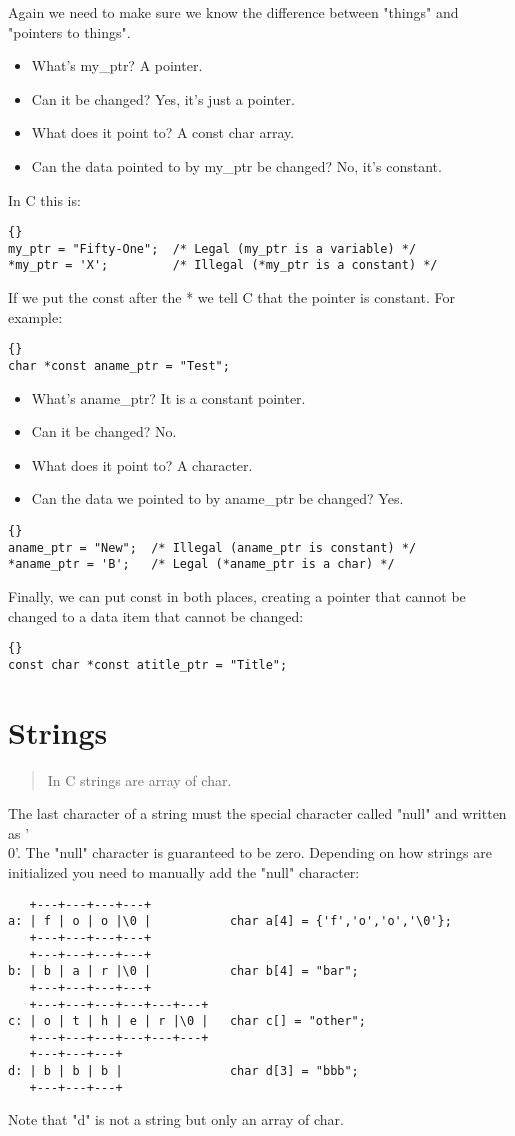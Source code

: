 \documentclass{report}
\begin{document}
Again we need to make sure we know the difference between "things" and "pointers to things".
\begin{itemize}
\item What's my\_ptr? A pointer.
\item Can it be changed? Yes, it's just a pointer.
\item What does it point to? A const char array.
\item Can the data pointed to by my\_ptr be changed? No, it's constant.
\end{itemize}
In C this is:
\begin{lstlisting}{}
my_ptr = "Fifty-One";  /* Legal (my_ptr is a variable) */
*my_ptr = 'X';         /* Illegal (*my_ptr is a constant) */
\end{lstlisting}
If we put the const after the * we tell C that the pointer is constant. 
For example:
\begin{lstlisting}{}
char *const aname_ptr = "Test";
\end{lstlisting}
\begin{itemize}
\item What's aname\_ptr? It is a constant pointer.
\item Can it be changed? No.
\item What does it point to? A character.
\item Can the data we pointed to by aname\_ptr be changed? Yes.
\end{itemize}
\begin{lstlisting}{}
aname_ptr = "New";  /* Illegal (aname_ptr is constant) */
*aname_ptr = 'B';   /* Legal (*aname_ptr is a char) */
\end{lstlisting}
Finally, we can put const in both places, creating a pointer that cannot be changed to a data item that cannot be changed:
\begin{lstlisting}{}
const char *const atitle_ptr = "Title";
\end{lstlisting}

\section{Strings}
\begin{quote}
In C strings are array of char.
\end{quote}
The last character of a string must the special character called "null" and written as '\\0'.
The "null" character is guaranteed to be zero. Depending on how strings are initialized you need to manually add the "null" character:
\begin{verbatim}
   +---+---+---+---+
a: | f | o | o |\0 |           char a[4] = {'f','o','o','\0'};
   +---+---+---+---+
   +---+---+---+---+
b: | b | a | r |\0 |           char b[4] = "bar";
   +---+---+---+---+
   +---+---+---+---+---+---+
c: | o | t | h | e | r |\0 |   char c[] = "other";
   +---+---+---+---+---+---+
   +---+---+---+
d: | b | b | b |               char d[3] = "bbb"; 
   +---+---+---+
\end{verbatim}
Note that "d" is not a string but only an array of char.
\end{document}
